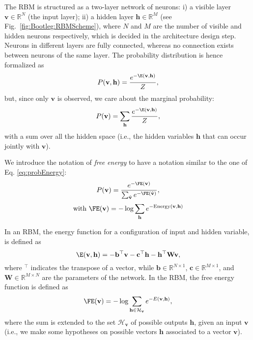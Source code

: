 The RBM is structured as a two-layer network of neurons: i) a visible layer $\mathbf{v} \in \mathbb{R}^{N}$ (the input layer); ii) a hidden layer $\mathbf{h} \in \mathbb{R}^{M}$ (see Fig.~\ref{fig:Bootleg:RBMScheme}), where $N$ and $M$ are the number of visible and hidden neurons respectively, which is decided in the architecture design step. Neurons in different layers are fully connected, whereas no connection exists between neurons of the same layer. The probability distribution is hence formalized as 
\begin{equation}
P(\mathbf{v},\mathbf{h})=\frac{e^{-\E(\mathbf{v},\mathbf{h})}}{Z},
\end{equation}
but, since only $\mathbf{v}$ is observed, we care about the marginal probability:
\begin{equation}
P(\mathbf{v})=\sum_\mathbf{h} \frac{e^{-\E(\mathbf{v},\mathbf{h})}}{Z},
\end{equation}
with a sum over all the hidden space (i.e., the hidden variables $\mathbf{h}$ that can occur jointly with $\mathbf{v}$).

We introduce the notation of \textit{free energy} to have a notation similar to the one of Eq. \ref{eq:probEnergy}:
\begin{equation}
P(\mathbf{v})=\frac{e^{-\FE(\mathbf{v})}}{\sum_{\tilde{\mathbf{v}}}e^{-\FE(\tilde{\mathbf{v}})}},
\end{equation}
\begin{equation}
\text{with }\FE(\mathbf{v})=-\log\sum_\mathbf{h} e^{-\text{Energy}(\mathbf{v},\mathbf{h})}
\label{eq:LLFs:freeenergy}
\end{equation}

In an RBM, the energy function for a configuration of input and hidden variable, is defined as \cite{Bengio2009}
\begin{equation}
\E(\mathbf{v},\mathbf{h}) = -\mathbf{b}^\top\mathbf{v} -\mathbf{c}^\top\mathbf{h}-\mathbf{h}^\top\mathbf{W}\mathbf{v},
\label{eq:HLFs:energyRBM}
\end{equation}
where $^\top$ indicates the transpose of a vector, while $\mathbf{b} \in \mathbb{R}^{N \times 1}$, $\mathbf{c} \in \mathbb{R}^{M\times 1}$, and $\mathbf{W} \in \mathbb{R}^{M \times N}$ are the parameters of the network. %
In the RBM, the free energy function is defined as \cite{Bengio2009}
\begin{equation}
\FE(\mathbf{v}) = -\log \sum_{\mathbf{h} \in \mathcal{H}_\mathbf{v}}e^{-E(\mathbf{v},\mathbf{h})},
\end{equation}
where the sum is extended to the set $\mathcal{H}_\mathbf{v}$ of possible outputs $\mathbf{h}$, given an input $\mathbf{v}$ (i.e., we make some hypotheses on possible vectors $\mathbf{h}$ associated to a vector $\mathbf{v}$). 


